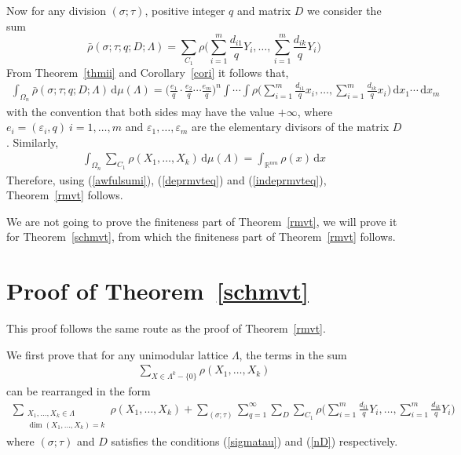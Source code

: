 \documentclass[11pt]{article}
\theoremstyle{definition}
\theoremstyle{proof}
\begin{document}
Now for any division $(\sigma; \tau )$, positive integer $q$ and matrix $D$ we consider the sum
\[
    \bar{\rho }(\sigma; \tau; q; D; \Lambda )= \sum_{C_1} \rho \bigg(\sum_{i=1}^{m}\frac{d_{i1}}{q}Y_i, \ldots, \sum_{i=1}^{m}\frac{d_{ik}}{q}Y_i \bigg)
\]
From Theorem~\ref{thmii} and Corollary~\ref{cori} it follows that,
\begin{align}\label{deprmvteq}
    \int_{{\Omega}_n} \bar{\rho }(\sigma; \tau; q; D; \Lambda ) \, \mathrm{d} \mu (\Lambda ) = \bigg(\frac{e_1}{q} \cdot \frac{e_2}{q} \cdots \frac{e_m}{q}\bigg)^n \int \cdots \int \rho \bigg(\sum_{i=1}^{m}\frac{d_{i1}}{q}x_i, \ldots, \sum_{i=1}^{m}\frac{d_{ik}}{q}x_i\bigg) \, \mathrm{d} x_1 \cdots \, \mathrm{d} x_m
\end{align}
with the convention that both sides may have the value $+\infty$, where $e_i=(\varepsilon _i, q) \ i=1, \ldots, m$ and $\varepsilon _1, \ldots, \varepsilon _m$ are the elementary divisors of the matrix $D$.
Similarly,
\begin{align}\label{indeprmvteq}
    \int_{{\Omega}_n} \sum_{C_1} \rho (X_1, \ldots, X_k) \, \mathrm{d} \mu (\Lambda ) = \int_{\mathbb{R}^{nm}} \rho (x) \, \mathrm{d} x
\end{align}
Therefore, using (\ref{awfulsumi}), (\ref{deprmvteq}) and (\ref{indeprmvteq}), Theorem~\ref{rmvt} follows.

We are not going to prove the finiteness part of Theorem~\ref{rmvt}, we will prove it for Theorem~\ref{schmvt}, from which the finiteness part of Theorem~\ref{rmvt} follows.

\section{Proof of Theorem~\ref{schmvt}}
This proof follows the same route as the proof of Theorem~\ref{rmvt}.

We first prove that for any unimodular lattice $\Lambda$, the terms in the sum
\begin{align}\label{awfulsumlhsii}
    \sum_{X \in \Lambda ^k - \{0\}} \rho(X_1, \ldots, X_k)
\end{align}
can be rearranged in the form
\begin{align}\label{awfulsumrhsii}
    \sum_{\substack{X_1, \ldots, X_k \in \Lambda \\ \dim (X_1, \ldots, X_k) = k}} \rho(X_1, \ldots, X_k) + \sum_{(\sigma ; \tau )}\sum_{q = 1}^{\infty} \sum_{D} \sum_{C_1} \rho\bigg(\sum_{i=1}^{m}\frac{d_{i1}}{q}Y_i, \ldots, \sum_{i=1}^{m}\frac{d_{ik}}{q}Y_i \bigg)
\end{align}
where $(\sigma; \tau )$ and $D$ satisfies the conditions (\ref{sigmatau}) and (\ref{nD}) respectively.
\end{document}
